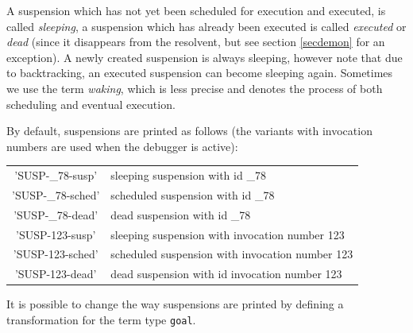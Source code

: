 A suspension which has not yet been scheduled
for execution and executed, is called {\em sleeping},
a suspension which has already been executed is called
{\em executed} or {\em dead} (since it disappears from the resolvent,
but see section \ref{secdemon} for an exception).
A newly created suspension is always sleeping, however
note that due to backtracking, an executed suspension
can become sleeping again.
Sometimes we use the term {\em waking}, which is less precise and
denotes the process of both scheduling and eventual execution.


By default, suspensions are printed as follows (the variants with invocation
numbers are used when the debugger is active):
\begin{center}
\begin{tabular}{|c|l|}
\hline
'SUSP-_78-susp'		&	sleeping suspension with id _78 \\
'SUSP-_78-sched'	&	scheduled suspension with id _78 \\
'SUSP-_78-dead'		&	dead suspension with id _78 \\
\hline
'SUSP-123-susp'		&	sleeping suspension with invocation number 123 \\
'SUSP-123-sched'	&	scheduled suspension with invocation number 123 \\
'SUSP-123-dead'		&	dead suspension with id invocation number 123 \\
\hline
\end{tabular}
\end{center}
It is possible to change the way suspensions are printed by defining a 
transformation for the term type {\tt goal}.



